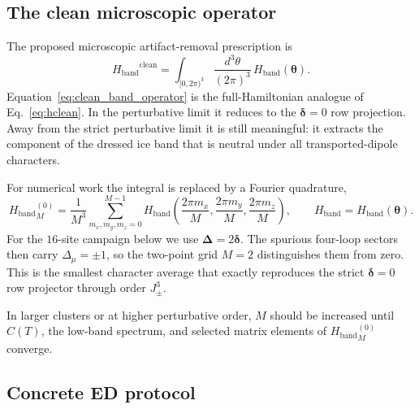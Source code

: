 \documentclass[11pt,letterpaper]{article}
\newcommand{\Jpm}{J_{\pm}}
\newcommand{\bdelta}{\bm \delta}
\newcommand{\bDelta}{\bm \Delta}
\newcommand{\btheta}{\bm \theta}
\newcommand{\HB}{H_{\mathrm{band}}}
\theoremstyle{plain}
\theoremstyle{definition}
\begin{document}
\subsection{The clean microscopic operator}

The proposed microscopic artifact-removal prescription is
\begin{equation}
\boxed{
{\HB}^{\mathrm{clean}}
=\int_{[0,2\pi)^3}\frac{d^3\theta}{(2\pi)^3}\,\HB(\btheta).
}
\label{eq:clean_band_operator}
\end{equation}
Equation~\eqref{eq:clean_band_operator} is the full-Hamiltonian analogue of
Eq.~\eqref{eq:hclean}.  In the perturbative limit it reduces to the
$\bdelta=0$ row projection.  Away from the strict perturbative limit it is
still meaningful: it extracts the component of the dressed ice band that is
neutral under all transported-dipole characters.

For numerical work the integral is replaced by a Fourier quadrature,
\begin{equation}
{\HB}^{(0)}_{M}=
\frac{1}{M^3}\sum_{m_x,m_y,m_z=0}^{M-1}
\HB\!\left(\frac{2\pi m_x}{M},
           \frac{2\pi m_y}{M},
           \frac{2\pi m_z}{M}\right),
\qquad \HB=\HB(\btheta).
\label{eq:grid_projection}
\end{equation}
For the $16$-site campaign below we use $\bDelta=2\bdelta$.  The spurious
four-loop sectors then carry $\Delta_\mu=\pm1$, so the two-point grid $M=2$
distinguishes them from zero.  This is the smallest character average that
exactly reproduces the strict $\bdelta=0$ row projector through order $\Jpm^3$.

In larger clusters or at higher perturbative order, $M$ should be increased
until $C(T)$, the low-band spectrum, and selected matrix elements of
${\HB}^{(0)}_M$ converge.

\subsection{Concrete ED protocol}
\end{document}
